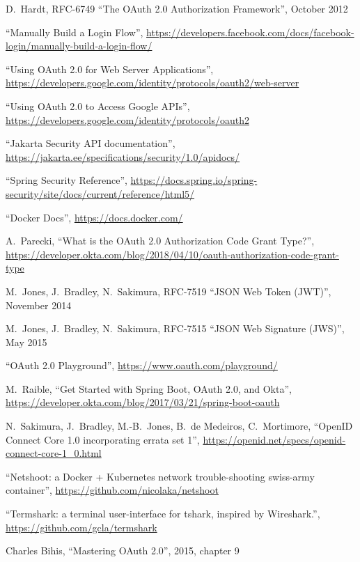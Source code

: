 \documentclass[a4paper,12pt]{article}
\def\rfc#1{RFC-#1\xspace}
\begin{document}
\begin{thebibliography}{99}
%
%

D.~Hardt,
\rfc{6749} ``The OAuth 2.0 Authorization Framework'', October 2012


``Manually Build a Login Flow'', \url{https://developers.facebook.com/docs/facebook-login/manually-build-a-login-flow/}

``Using OAuth 2.0 for Web Server Applications'', \url{https://developers.google.com/identity/protocols/oauth2/web-server}

``Using OAuth 2.0 to Access Google APIs'', \url{https://developers.google.com/identity/protocols/oauth2}

``Jakarta Security API documentation'', \url{https://jakarta.ee/specifications/security/1.0/apidocs/}

``Spring Security Reference'', \url{https://docs.spring.io/spring-security/site/docs/current/reference/html5/}

``Docker Docs'', \url{https://docs.docker.com/}

A.~Parecki, ``What is the OAuth 2.0 Authorization Code Grant Type?'', \url{https://developer.okta.com/blog/2018/04/10/oauth-authorization-code-grant-type}

M.~Jones, J.~Bradley, N.~Sakimura, RFC-7519 ``JSON Web Token (JWT)'', November 2014

M.~Jones, J.~Bradley, N.~Sakimura, RFC-7515 ``JSON Web Signature (JWS)'', May 2015

``OAuth 2.0 Playground'', \url{https://www.oauth.com/playground/}

M.~Raible, ``Get Started with Spring Boot, OAuth 2.0, and Okta'', \url{https://developer.okta.com/blog/2017/03/21/spring-boot-oauth}

N.~Sakimura, J.~Bradley, M.-B.~Jones, B.~de Medeiros, C.~Mortimore, ``OpenID Connect Core 1.0 incorporating errata set 1'', \url{https://openid.net/specs/openid-connect-core-1_0.html}

``Netshoot: a Docker + Kubernetes network trouble-shooting swiss-army container'', \url{https://github.com/nicolaka/netshoot}

``Termshark: a terminal user-interface for tshark, inspired by Wireshark.'', \url{https://github.com/gcla/termshark}

Charles Bihis, ``Mastering OAuth 2.0'', 2015, chapter 9

\end{thebibliography}
\end{document}

